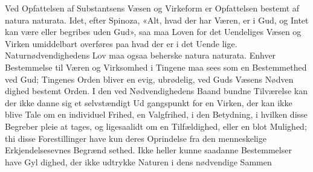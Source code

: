 \documentclass[12pt,a4paper]{book}
\begin{document}
Ved Opfattelsen af Substantsens Væsen og Virkeform er
Opfattelsen bestemt af natura naturata. Idet, efter Spinoza,
«Alt, hvad der har Væren, er i Gud, og Intet kan være eller
begribes uden Gud», saa maa Loven for det Uendeliges Væsen
og Virken umiddelbart overføres paa hvad der er i det Uende\-%
lige. Naturnødvendighedens Lov maa ogsaa beherske natura
naturata. Enhver Bestemmelse til Væren og Virksomhed i
Tingene maa sees som en Bestemmethed ved Gud; Tingenes
Orden bliver en evig, ubrødelig, ved Guds Væsens Nødven\-%
dighed bestemt Orden. I den ved Nødvendighedens Baand
bundne Tilværelse kan der ikke danne sig et selvstændigt Ud\-%
gangspunkt for en Virken, der kan ikke blive Tale om en
individuel Frihed, en Valgfrihed, i den Betydning, i hvilken
disse Begreber pleie at tages, og ligesaalidt om en Tilfældighed,
eller en blot Mulighed; thi disse Forestillinger have kun deres
Oprindelse fra den menneskelige Erkjendelsesevnes Begrænd\-%
sethed. Ikke heller kunne saadanne Bestemmelser have Gyl\-%
dighed, der ikke udtrykke Naturen i dens nødvendige Sammen\-%
%
%
\end{document}

